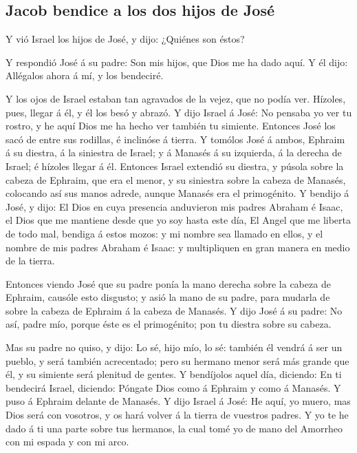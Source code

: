 \hypertarget{jacob-bendice-a-los-dos-hijos-de-josuxe9}{%
\subsection{Jacob bendice a los dos hijos de
José}\label{jacob-bendice-a-los-dos-hijos-de-josuxe9}}

 Y vió Israel los hijos de José, y dijo: ¿Quiénes son
éstos?

 Y respondió José á su padre: Son mis hijos, que Dios me
ha dado aquí. Y él dijo: Allégalos ahora á mí, y los bendeciré.

 Y los ojos de Israel estaban tan agravados de la vejez,
que no podía ver. Hízoles, pues, llegar á él, y él los besó y abrazó.
 Y dijo Israel á José: No pensaba yo ver tu rostro, y he
aquí Dios me ha hecho ver también tu simiente.  Entonces
José los sacó de entre sus rodillas, é inclinóse á tierra.
 Y tomólos José á ambos, Ephraim á su diestra, á la
siniestra de Israel; y á Manasés á su izquierda, á la derecha de Israel;
é hízoles llegar á él.  Entonces Israel extendió su
diestra, y púsola sobre la cabeza de Ephraim, que era el menor, y su
siniestra sobre la cabeza de Manasés, colocando así sus manos adrede,
aunque Manasés era el primogénito.  Y bendijo á José, y
dijo: El Dios en cuya presencia anduvieron mis padres Abraham é Isaac,
el Dios que me mantiene desde que yo soy hasta este día, 
El Angel que me liberta de todo mal, bendiga á estos mozos: y mi nombre
sea llamado en ellos, y el nombre de mis padres Abraham é Isaac: y
multipliquen en gran manera en medio de la tierra.

 Entonces viendo José que su padre ponía la mano derecha
sobre la cabeza de Ephraim, causóle esto disgusto; y asió la mano de su
padre, para mudarla de sobre la cabeza de Ephraim á la cabeza de
Manasés.  Y dijo José á su padre: No así, padre mío,
porque éste es el primogénito; pon tu diestra sobre su cabeza.

 Mas su padre no quiso, y dijo: Lo sé, hijo mío, lo sé:
también él vendrá á ser un pueblo, y será también acrecentado; pero su
hermano menor será más grande que él, y su simiente será plenitud de
gentes.  Y bendíjolos aquel día, diciendo: En ti
bendecirá Israel, diciendo: Póngate Dios como á Ephraim y como á
Manasés. Y puso á Ephraim delante de Manasés.  Y dijo
Israel á José: He aquí, yo muero, mas Dios será con vosotros, y os hará
volver á la tierra de vuestros padres.  Y yo te he dado á
ti una parte sobre tus hermanos, la cual tomé yo de mano del Amorrheo
con mi espada y con mi arco.

